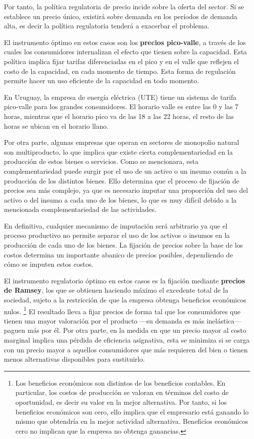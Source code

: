 \documentclass[
  12pt,
  spanish,
]{book}
\begin{document}
Por tanto, la política regulatoria de precio incide sobre la oferta del sector. Si se establece un precio único, existirá sobre demanda en los períodos de demanda alta, es decir la política regulatoria tenderá a exacerbar el problema.

El instrumento óptimo en estos casos son los \textbf{precios pico-valle}, a través de los cuales los consumidores internalizan el efecto que tienen sobre la capacidad. Esta política implica fijar tarifas diferenciadas en el pico y en el valle que reflejen el costo de la capacidad, en cada momento de tiempo. Esta forma de regulación permite hacer un uso eficiente de la capacidad en todo momento.

En Uruguay, la empresa de energía eléctrica (UTE) tiene un sistema de tarifa pico-valle para los grandes consumidores. El horario valle es entre las 0 y las 7 horas, mientras que el horario pico va de las 18 a las 22 horas, el resto de las horas se ubican en el horario llano.

Por otra parte, algunas empresas que operan en sectores de monopolio natural son multiproducto, lo que implica que existe cierta complementariedad en la producción de estos bienes o servicios. Como se mencionara, esta complementariedad puede surgir por el uso de un activo o un insumo común a la producción de los distintos bienes. Ello determina que el proceso de fijación de precios sea más complejo, ya que es necesario imputar una proporción del uso del activo o del insumo a cada uno de los bienes, lo que es muy difícil debido a la mencionada complementariedad de las actividades.

En definitiva, cualquier mecanismo de imputación será arbitrario ya que el proceso productivo no permite separar el uso de los activos o insumos en la producción de cada uno de los bienes. La fijación de precios sobre la base de los costos determina un importante abanico de precios posibles, dependiendo de cómo se imputen estos costos.

El instrumento regulatorio óptimo en estos casos es la fijación mediante \textbf{precios de Ramsey}, los que se obtienen haciendo máximo el excedente total de la sociedad, sujeto a la restricción de que la empresa obtenga beneficios
económicos nulos.
\footnote{Los beneficios económicos son distintos de los beneficios contables. En particular, los costos de producción se valoran en términos del costo de oportunidad, es decir su valor en la mejor alternativa. Por tanto, si los beneficios económicos son cero, ello implica que el empresario está ganando lo mismo que obtendría en la mejor actividad alternativa. Beneficios económicos cero no implican que la empresa no obtenga ganancias.}
El resultado lleva a fijar precios de forma tal que los consumidores que tienen una mayor valoración por el producto ---su demanda es más inelástica--- paguen más por él. Por otra parte, en la medida en que un precio mayor al costo marginal implica una pérdida de eficiencia asignativa, esta se minimiza si se carga con un precio mayor a aquellos consumidores que más requieren del bien o tienen menos alternativas disponibles para sustituirlo.
\end{document}
